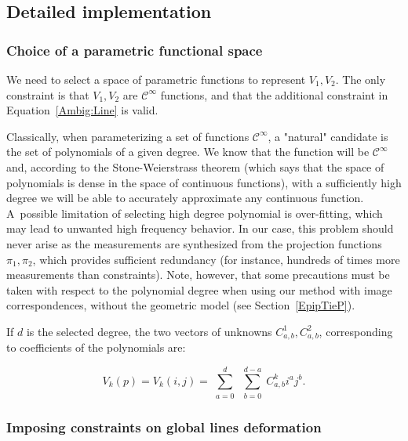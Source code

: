 \documentclass{ipol}
\begin{document}
\subsection{Detailed implementation}\label{subsec:implement}


\subsubsection{Choice of a parametric functional space}
\label{ChoicePolyn}

We need to select a space of parametric functions to represent $V_1,V_2$. The only constraint
is that $V_1,V_2$ are $\mathcal{C}^{\infty}$ functions, and that the additional constraint in 
Equation~\eqref{Ambig:Line} is valid. 

Classically, when parameterizing a set of functions  $\mathcal{C}^{\infty}$,
a "natural" candidate is the set of polynomials of a given degree. We know that the function will be
$\mathcal{C}^{\infty}$ and, according to the Stone-Weierstrass theorem \cite{Weierstrass1885,Stone1937} (which says that the space of polynomials is dense in the space of continuous functions),  with a sufficiently high
degree we will be able to accurately approximate any continuous function. A~possible
limitation of selecting high degree polynomial is over-fitting, which may lead to
unwanted high frequency behavior. In our case, this problem should never arise as the measurements  are synthesized from the projection functions $\pi_1,\pi_2$, which provides sufficient redundancy (for instance,
 hundreds of times more measurements than constraints). {Note, however, that some precautions must be taken with respect to the polynomial degree when using our method with image correspondences, without the geometric model (see Section~\ref{EpipTieP})}.

If $d$ is the selected degree, the two vectors of unknowns $C^1_{a,b},C^2_{a,b}$, 
corresponding to coefficients of the polynomials are:


\begin{equation}
   V_k(p) = V_k(i,j) =  \sum\limits_{\substack{a=0}}^d  \sum\limits_{\substack{b=0}}^{d-a}  C^k_{a,b}  i^a j^b. \label{EqPol}
\end{equation}
   
\subsubsection{Imposing constraints on global lines deformation}
\end{document}
